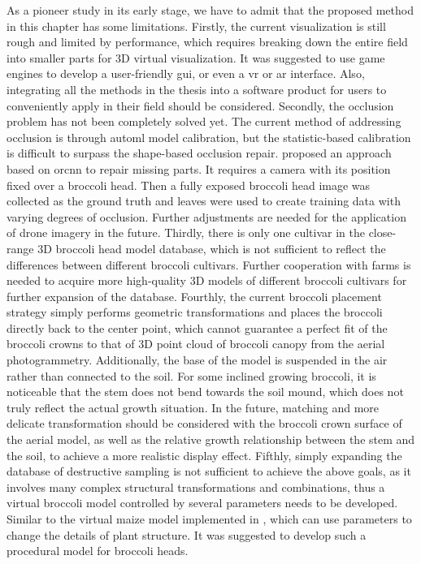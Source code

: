 As a pioneer study in its early stage, we have to admit that the proposed method in this chapter has some limitations. 
Firstly, the current visualization is still rough and limited by performance, which requires breaking down the entire field into smaller parts for 3D virtual visualization. It was suggested to use game engines to develop a user-friendly \gls{gui}, or even a \gls{vr} or \gls{ar} interface. Also, integrating all the methods in the thesis into a software product for users to conveniently apply in their field should be considered. 
Secondly, the occlusion problem has not been completely solved yet. The current method of addressing occlusion is through \gls{automl} model calibration, but the statistic-based calibration is difficult to surpass the shape-based occlusion repair. \citet{blok_image_2021} proposed an approach based on \gls{orcnn} to repair missing parts. It requires a camera with its position fixed over a broccoli head. Then a fully exposed broccoli head image was collected as the ground truth and leaves were used to create training data with varying degrees of occlusion. Further adjustments are needed for the application of drone imagery in the future. 
Thirdly, there is only one cultivar in the close-range 3D broccoli head model database, which is not sufficient to reflect the differences between different broccoli cultivars. Further cooperation with farms is needed to acquire more high-quality 3D models of different broccoli cultivars for further expansion of the database. 
Fourthly, the current broccoli placement strategy simply performs geometric transformations and places the broccoli directly back to the center point, which cannot guarantee a perfect fit of the broccoli crowns to that of 3D point cloud of broccoli canopy from the aerial photogrammetry. Additionally, the base of the model is suspended in the air rather than connected to the soil. For some inclined growing broccoli, it is noticeable that the stem does not bend towards the soil mound, which does not truly reflect the actual growth situation. In the future, matching and more delicate transformation should be considered with the broccoli crown surface of the aerial model, as well as the relative growth relationship between the stem and the soil, to achieve a more realistic display effect.
Fifthly, simply expanding the database of destructive sampling is not sufficient to achieve the above goals, as it involves many complex structural transformations and combinations, thus a  virtual broccoli model controlled by several parameters needs to be developed. Similar to the virtual maize model implemented in \citet{cieslak_l-system_2021}, which can use parameters to change the details of plant structure. It was suggested to develop such a procedural model for broccoli heads. 